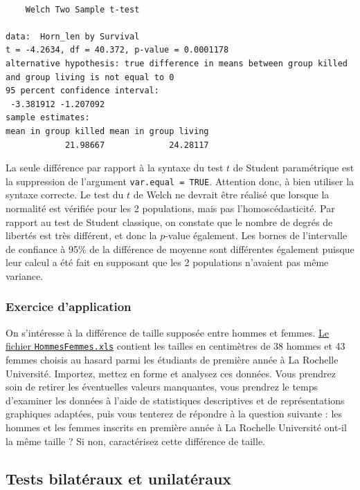 \documentclass[
  a4paper,
]{article}
\begin{document}
\begin{verbatim}

    Welch Two Sample t-test

data:  Horn_len by Survival
t = -4.2634, df = 40.372, p-value = 0.0001178
alternative hypothesis: true difference in means between group killed and group living is not equal to 0
95 percent confidence interval:
 -3.381912 -1.207092
sample estimates:
mean in group killed mean in group living 
            21.98667             24.28117 
\end{verbatim}

La seule différence par rapport à la syntaxe du test \(t\) de Student paramétrique est la suppression de l'argument \texttt{var.equal\ =\ TRUE}. Attention donc, à bien utiliser la syntaxe correcte. Le test du \(t\) de Welch ne devrait être réalisé que lorsque la normalité est vérifiée pour les 2 populations, mais pas l'homoscédasticité. Par rapport au test de Student classique, on constate que le nombre de degrés de libertés est très différent, et donc la \(p\)-value également. Les bornes de l'intervalle de confiance à 95\% de la différence de moyenne sont différentes également puisque leur calcul a été fait en supposant que les 2 populations n'avaient pas même variance.

\hypertarget{exercice-dapplication-2}{%
\subsubsection{Exercice d'application}\label{exercice-dapplication-2}}

On s'intéresse à la différence de taille supposée entre hommes et femmes. \href{https://besibo.github.io/Biometrie3/data/HommesFemmes.xls}{Le fichier \texttt{HommesFemmes.xls}} contient les tailles en centimètres de 38 hommes et 43 femmes choisis au hasard parmi les étudiants de première année à La Rochelle Université. Importez, mettez en forme et analysez ces données. Vous prendrez soin de retirer les éventuelles valeurs manquantes, vous prendrez le temps d'examiner les données à l'aide de statistiques descriptives et de représentations graphiques adaptées, puis vous tenterez de répondre à la question suivante : les hommes et les femmes inscrits en première année à La Rochelle Université ont-il la même taille ? Si non, caractérisez cette différence de taille.

\hypertarget{tests-bilatuxe9raux-et-unilatuxe9raux}{%
\subsection{Tests bilatéraux et unilatéraux}\label{tests-bilatuxe9raux-et-unilatuxe9raux}}
\end{document}

